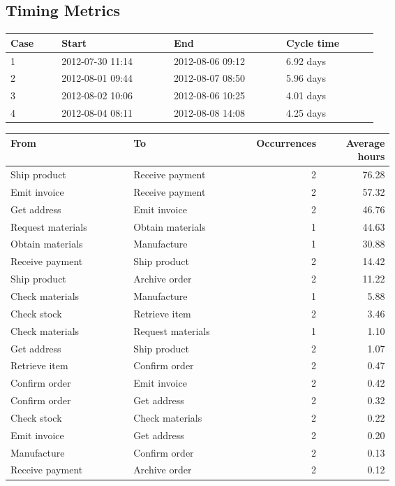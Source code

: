 \subsection{Timing Metrics}
\begin{longtable}{p{0.10\linewidth}p{0.22\linewidth}p{0.22\linewidth}p{0.18\linewidth}}
\toprule
Case & Start & End & Cycle time \\
\midrule
1 & 2012-07-30 11:14 & 2012-08-06 09:12 & 6.92 days \\
2 & 2012-08-01 09:44 & 2012-08-07 08:50 & 5.96 days \\
3 & 2012-08-02 10:06 & 2012-08-06 10:25 & 4.01 days \\
4 & 2012-08-04 08:11 & 2012-08-08 14:08 & 4.25 days \\
\bottomrule
\end{longtable}
\begin{longtable}{p{0.32\linewidth}p{0.32\linewidth}r r}
\toprule
From & To & Occurrences & Average hours \\
\midrule
Ship product & Receive payment & 2 & 76.28 \\
Emit invoice & Receive payment & 2 & 57.32 \\
Get address & Emit invoice & 2 & 46.76 \\
Request materials & Obtain materials & 1 & 44.63 \\
Obtain materials & Manufacture & 1 & 30.88 \\
Receive payment & Ship product & 2 & 14.42 \\
Ship product & Archive order & 2 & 11.22 \\
Check materials & Manufacture & 1 & 5.88 \\
Check stock & Retrieve item & 2 & 3.46 \\
Check materials & Request materials & 1 & 1.10 \\
Get address & Ship product & 2 & 1.07 \\
Retrieve item & Confirm order & 2 & 0.47 \\
Confirm order & Emit invoice & 2 & 0.42 \\
Confirm order & Get address & 2 & 0.32 \\
Check stock & Check materials & 2 & 0.22 \\
Emit invoice & Get address & 2 & 0.20 \\
Manufacture & Confirm order & 2 & 0.13 \\
Receive payment & Archive order & 2 & 0.12 \\
\bottomrule
\end{longtable}
